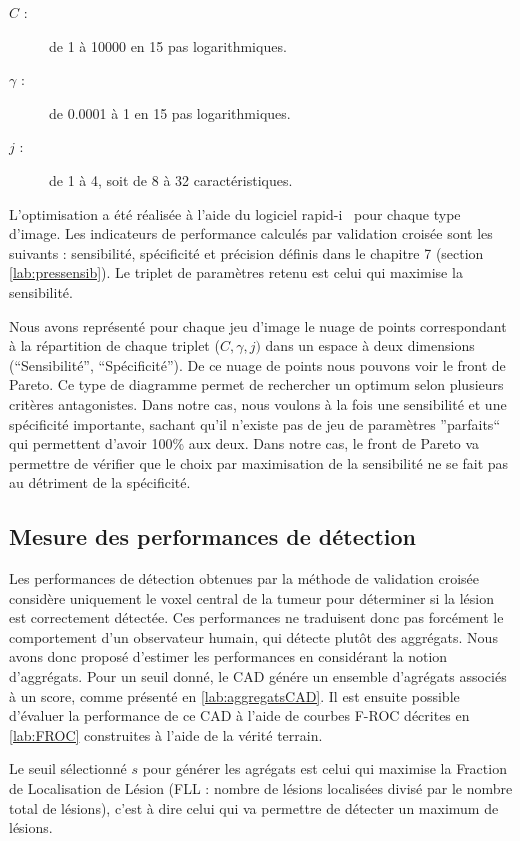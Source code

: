 \begin{description}
 \item [$C$ :] de 1 à 10000 en 15 pas logarithmiques.
 \item [$\gamma$ :] de 0.0001 à 1 en 15 pas logarithmiques.
 \item [$j$ :] de 1 à 4, soit de 8 à 32 caractéristiques.
\end{description}

L'optimisation a été réalisée à l'aide du logiciel rapid-i~\cite{mierswa2006} pour chaque type d'image. Les indicateurs de performance calculés par validation croisée sont les suivants : sensibilité, spécificité et précision définis dans le chapitre 7 (section \ref{lab:pressensib}). Le triplet de paramètres retenu est celui qui maximise la sensibilité.

Nous avons représenté pour chaque jeu d'image le nuage de points correspondant à la répartition de chaque triplet ($C, \gamma, j)$ dans un espace à deux dimensions (``Sensibilité'', ``Spécificité''). De ce nuage de points nous pouvons voir le front de Pareto. Ce type de diagramme permet de rechercher un optimum selon plusieurs critères antagonistes. Dans notre cas, nous voulons à la fois une sensibilité et une spécificité importante, sachant qu'il n'existe pas de jeu de paramètres ''parfaits`` qui permettent d'avoir 100\% aux deux. Dans notre cas, le front de Pareto va permettre de vérifier que le choix par maximisation de la sensibilité ne se fait pas au détriment de la spécificité.


\subsection{Mesure des performances de détection}
\label{lab:selectionSeuil}
\label{lab:optimIMSTNOMS}
Les performances de détection obtenues par la méthode de validation croisée considère uniquement le voxel central de la tumeur
pour déterminer si la lésion est correctement détectée. Ces performances ne traduisent donc pas forcément le comportement d'un observateur humain, qui détecte plutôt des aggrégats. Nous avons donc proposé d'estimer les performances en considérant la notion d'aggrégats. Pour un seuil donné, le CAD génére un ensemble d'agrégats associés à un score, comme présenté en \ref{lab:aggregatsCAD}. Il est ensuite possible d'évaluer la performance de ce CAD à l'aide de courbes F-ROC décrites en \ref{lab:FROC} construites à l'aide de la vérité terrain.

Le seuil sélectionné $s$ pour générer les agrégats est celui qui maximise la Fraction de Localisation de Lésion (FLL : nombre de lésions localisées divisé par le nombre total de lésions), c'est à dire celui qui va permettre de détecter un maximum de lésions. 

